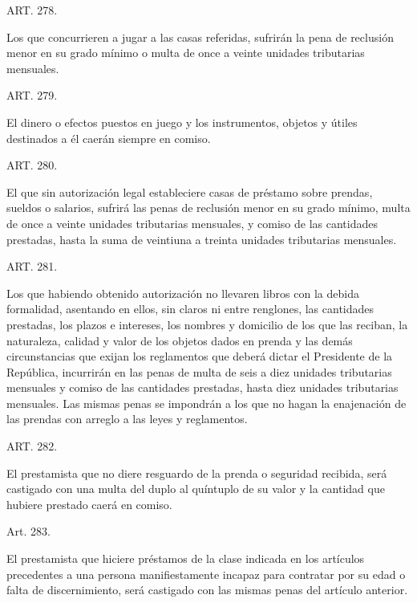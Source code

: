     ART. 278.

    Los que concurrieren a jugar a las casas referidas, sufrirán la pena de reclusión menor en su grado mínimo o multa de once a veinte unidades tributarias mensuales.










    ART. 279.

    El dinero o efectos puestos en juego y los instrumentos, objetos y útiles destinados a él caerán siempre en comiso.


    ART. 280.

    El que sin autorización legal estableciere casas de préstamo sobre prendas, sueldos o salarios, sufrirá las penas de reclusión menor en su grado mínimo, multa de once a veinte unidades tributarias mensuales, y comiso de las cantidades prestadas, hasta la suma de veintiuna a treinta unidades tributarias mensuales.







    ART. 281.

    Los que habiendo obtenido autorización no llevaren libros con la debida formalidad, asentando en ellos, sin claros ni entre renglones, las cantidades prestadas, los plazos e intereses, los nombres y domicilio de los que las reciban, la naturaleza, calidad y valor de los objetos dados en prenda y las demás circunstancias que exijan los reglamentos que deberá dictar el Presidente de la República, incurrirán en las penas de multa de seis a diez unidades tributarias mensuales y comiso de las cantidades prestadas, hasta diez unidades tributarias mensuales.
    Las mismas penas se impondrán a los que no hagan la enajenación de las prendas con arreglo a las leyes y reglamentos.





    ART. 282.

    El prestamista que no diere resguardo de la prenda o seguridad recibida, será castigado con una multa del duplo al quíntuplo de su valor y la cantidad que hubiere prestado caerá en comiso.


    Art. 283.

    El prestamista que hiciere préstamos de la clase indicada en los artículos precedentes a una persona manifiestamente incapaz para contratar por su edad o falta de discernimiento, será castigado con las mismas penas del artículo anterior.



